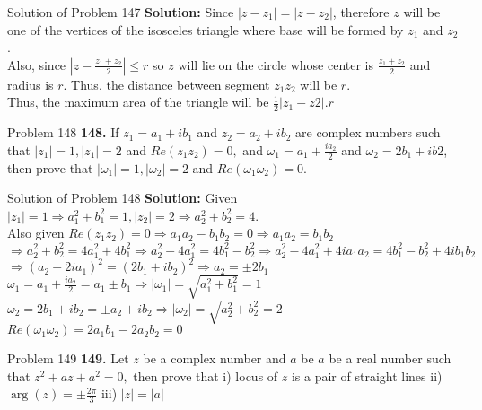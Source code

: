 \documentclass[aspectratio=169,8pt]{beamer}
\begin{document}
\begin{frame}{Solution of Problem 147}
  \textbf{Solution:} Since $|z - z_1| = |z - z_2|$, therefore $z$ will be one of the vertices of the isosceles triangle where base
  will be formed by $z_1$ and $z_2$.\\
  \vspace*{0.2cm}
  Also, since $\left|z - \frac{z_1 + z_2}{2}\right|\leq r$ so $z$ will lie on the circle whose center is $\frac{z_1 + z_2}{2}$ and
  radius is $r$. Thus, the distance between segment $z_1z_2$ will be $r$.\\
  \vspace*{0.2cm}
  Thus, the maximum area of the triangle will be $\frac{1}{2}|z_1 - z2|.r$
\end{frame}
\begin{frame}{Problem 148}
  \textbf{148.} If $z_1 = a_1 + ib_1$ and $z_2 = a_2 + ib_2$ are complex numbers such that $|z_1| = 1, |z_1| = 2$ and $Re(z_1z_2) =
  0,$ and $\omega_1 = a_1 + \frac{ia_2}{2}$ and $\omega_2 = 2b_1 + ib2$, then prove that $|\omega_1| = 1, |\omega_2| = 2$ and
  $Re(\omega_1\omega_2) = 0$.
\end{frame}
\begin{frame}{Solution of Problem 148}
  \textbf{Solution:} Given $|z_1| = 1 \Rightarrow a_1^2 + b_1^2 = 1, |z_2| = 2 \Rightarrow a_2^2 + b_2^2 = 4$.\\
  \vspace*{0.2cm}
  Also given $Re(z_1z_2) = 0 \Rightarrow a_1a_2 - b_1b_2 = 0 \Rightarrow a_1a_2 = b_1b_2$\\
  \vspace*{0.2cm}
  $\Rightarrow a_2^2 + b_2^2 = 4a_1^2 + 4b_1^2 \Rightarrow a_2^2 - 4a_1^2 = 4b_1^2 - b_2^2 \Rightarrow a_2^2 - 4a_1^2 + 4ia_1a_2 =
  4b_1^2 - b_2^2 + 4ib_1b_2$\\
  \vspace*{0.2cm}
  $\Rightarrow (a_2 + 2ia_1)^2 = (2b_1 + ib_2)^2 \Rightarrow a_2 = \pm 2b_1$\\
  \vspace*{0.2cm}
  $\omega_1 = a_1 + \frac{ia_2}{2} = a_1 \pm b_1 \Rightarrow |\omega_1| = \sqrt{a_1^2 + b_1^2} = 1$\\
  \vspace*{0.2cm}
  $\omega_2 = 2b_1 + ib_2 = \pm a_2 + ib_2 \Rightarrow |\omega_2| = \sqrt{a_2^2 + b_2^2} = 2$\\
  \vspace*{0.2cm}
  $Re(\omega_1\omega_2) = 2a_1b_1 - 2a_2b_2 = 0$
\end{frame}
\begin{frame}{Problem 149}
  \textbf{149.} Let $z$ be a complex number and $a$ be $a$ be a real number such that $z^2 + az + a^2 = 0,$ then prove that i)
  locus of $z$ is a pair of straight lines ii) $\arg(z) = \pm\frac{2\pi}{3}$ iii) $|z| = |a|$
\end{frame}
\end{document}
